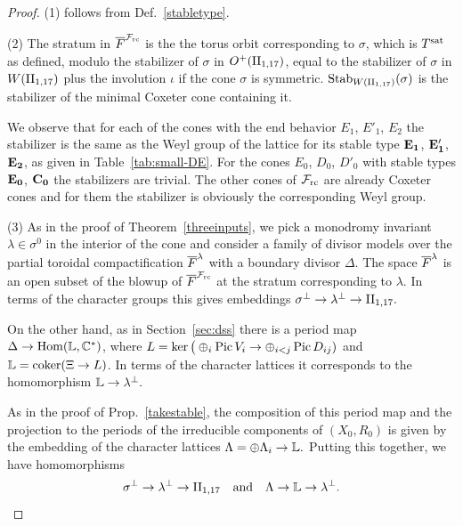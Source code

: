 \documentclass[table,x11names]{amsart}
\begin{document}
\begin{proof}
  (1) follows from Def.~\ref{stabletype}.

  (2) The stratum in ${\overline F}^{{\mathcal F}_{\rm rc}}$ is the the torus orbit corresponding to
  $\sigma$, which is $T^{\rm sat}$ as defined, modulo the stabilizer of
  $\sigma$ in $O^+(\IIell)$, equal to the stabilizer of $\sigma$ in
  $W(\IIell)$ plus the involution $\iota$ if the cone $\sigma$ is
  symmetric.  $\Stab_{W(\IIell)}(\sigma)$ is the stabilizer of the
  minimal Coxeter cone containing it.

  We observe that for each of the
  cones with the end behavior $E_1$, $E'_1$, $E_2$ the
  stabilizer is the same as the Weyl group of the lattice for its
  stable type ${\bf E_1}$, ${\bf E_1'}$, ${\bf E_2}$, as given in
  Table~\ref{tab:small-DE}.
  For the cones $E_0$, $D_0$, $D'_0$
  with stable types ${\bf E_0}$, ${\bf C_0}$ the stabilizers are trivial.  The
  other cones of ${\mathcal F}_{\rm rc}$ are already Coxeter cones and for them the
  stabilizer is obviously the corresponding Weyl group.

  (3) As in the proof of Theorem~\ref{threeinputs}, we pick a
  monodromy invariant $\lambda\in\sigma^0$ in the interior of the cone
  and consider a family of divisor models over the partial toroidal
  compactification ${\overline F}^\lambda$ with a boundary divisor
  $\Delta$.  The space ${\overline F}^\lambda$ is an open subset of the blowup
  of ${\overline F}^{{\mathcal F}_{\rm rc}}$ at the stratum corresponding to $\lambda$. In terms of
  the character groups this gives embeddings
  \begin{math}
    \sigma^\perp \to \lambda^\perp \to \IIell.
  \end{math}

  On the other hand, as in Section~\ref{sec:dss} there is a period map
  $\Delta \to \operatorname{Hom}({\mathbb L}, {\mathbb C}^*)$, where $L=\ker\big( \oplus_i \operatorname{Pic} V_i
  \to \oplus_{i<j} \operatorname{Pic} D_{ij} )$ and
  ${\mathbb L} = \operatorname{coker}(\Xi \to L)$. In terms of the character lattices it
  corresponds to the homomorphism
  \begin{math}
    {\mathbb L} \to \lambda^\perp.
  \end{math}

  As in the proof of Prop.~\ref{takestable}, the composition of this
  period map and the projection to the periods of the irreducible
  components of $(X_0,R_0)$ is given by the embedding of the character
  lattices
  \begin{math}
    \Lambda = \oplus\Lambda_i \to {\mathbb L}.
  \end{math}
  Putting this together, we have homomorphisms
  \begin{displaymath}
    \sigma^\perp \to \lambda^\perp \to \IIell
    \quad\text{and}\quad
    \Lambda \to \bL \to \lambda^\perp.
  \end{displaymath}
  

\end{proof}
\end{document}

